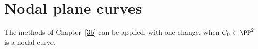 %
%
%
%
%
%


\section{Nodal plane curves}\label{nodal curves section}

The methods of Chapter~\ref{3b}
 can be applied, with one change, when $C_{0}\subset \PP^{2}$
is a nodal curve. 

